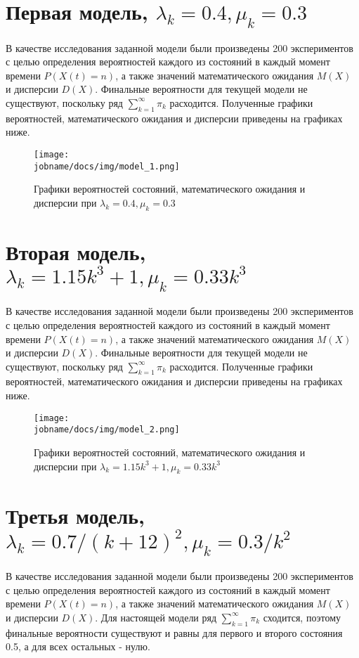 \section*{Первая модель, $\lambda_k = 0.4, \mu_k = 0.3$}

В качестве исследования заданной модели были произведены 200 экспериментов с целью определения вероятностей каждого
из состояний в каждый момент времени $P(X(t)=n)$, а также значений математического ожидания $M(X)$ и дисперсии $D(X)$.
Финальные вероятности для текущей модели не существуют, поскольку ряд $\sum_{k=1}^{\infty}\pi_k$ расходится.
Полученные графики вероятностей, математического ожидания и дисперсии приведены на графиках ниже.

\begin{figure}[h!]
    \centering
    \texttt{[image: \\jobname/docs/img/model\_1.png]}
    \caption{Графики вероятностей состояний, математического ожидания и дисперсии при $\lambda_k = 0.4, \mu_k = 0.3$}
\end{figure}

\newpage

\section*{Вторая модель, $\lambda_k = 1.15k^3 + 1, \mu_k = 0.33k^3$}

В качестве исследования заданной модели были произведены 200 экспериментов с целью определения вероятностей каждого
из состояний в каждый момент времени $P(X(t)=n)$, а также значений математического ожидания $M(X)$ и дисперсии $D(X)$.
Финальные вероятности для текущей модели не существуют, поскольку ряд $\sum_{k=1}^{\infty}\pi_k$ расходится.
Полученные графики вероятностей, математического ожидания и дисперсии приведены на графиках ниже.

\begin{figure}[h!]
    \centering
    \texttt{[image: \\jobname/docs/img/model\_2.png]}
    \caption{Графики вероятностей состояний, математического ожидания и дисперсии при $\lambda_k = 1.15k^3 + 1, \mu_k = 0.33k^3$}
\end{figure}

\newpage

\section*{Третья модель, $\lambda_k = 0.7 / (k + 12)^2, \mu_k = 0.3 / k^2$}

В качестве исследования заданной модели были произведены 200 экспериментов с целью определения вероятностей каждого
из состояний в каждый момент времени $P(X(t)=n)$, а также значений математического ожидания $M(X)$ и дисперсии $D(X)$.
Для настоящей модели ряд $\sum_{k=1}^{\infty}\pi_k$ сходится, поэтому финальные вероятности существуют и равны
для первого и второго состояния 0.5, а для всех остальных - нулю.

